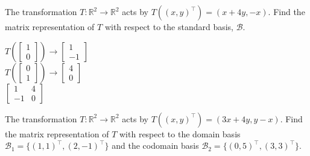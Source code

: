 	\item The transformation $T\colon\mathbb{R}^2\to\mathbb{R}^2$ acts by $T((x,y)^\intercal) = (x+4y,-x)$. Find the matrix representation of $T$ with respect to the standard basis, $\mathcal{B}$.
	
	\begin{solution}
	\newline
		$T(\begin{bmatrix} 1 \\ 0 \end{bmatrix}) \to \begin{bmatrix} 1 \\ -1 \end{bmatrix}$
		\\
		$T(\begin{bmatrix} 0 \\ 1 \end{bmatrix}) \to \begin{bmatrix} 4 \\ 0 \end{bmatrix}$
		\\
		$
		\begin{bmatrix}
		1 & 4 \\
		-1 & 0
		\end{bmatrix}$
	\end{solution}
	
	\item The transformation $T\colon\mathbb{R}^2\to\mathbb{R}^2$ acts by $T((x,y)^\intercal) = (3x+4y,y-x)$. Find the matrix representation of $T$ with respect to the domain basis $\mathcal{B}_1 = \{ (1,1)^\intercal, (2,-1)^\intercal \}$ and the codomain basis $\mathcal{B}_2 = \{ (0,5)^\intercal, (3,3)^\intercal \}$.
	
